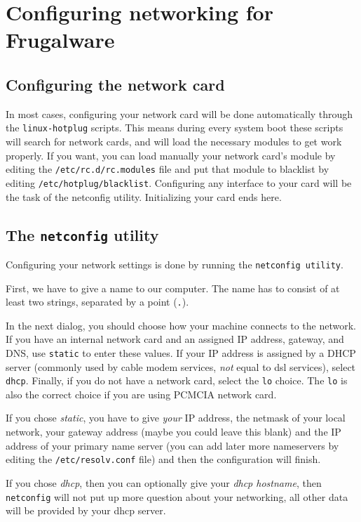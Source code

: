 \chapter{Configuring networking for Frugalware}
\section{Configuring the network card}

In most cases, configuring your network card will be done automatically through the {\tt linux-hotplug} scripts. This means during every system boot these scripts will search for network cards, and will load the necessary modules to get work properly. If you want, you can load manually your network card's module by editing the {\tt /etc/rc.d/rc.modules} file and put that module to blacklist by editing {\tt /etc/hotplug/blacklist}. Configuring any interface to your card will be the task of the netconfig utility. Initializing your card ends here.

\section{The {\tt netconfig} utility}
\label{section:netconfig}
Configuring your network settings is done by running the {\tt netconfig utility}.

First, we have to give a name to our computer. The name has to consist of at least two strings, separated by a point ({\tt .}).

In the next dialog, you should choose how your machine connects to the network. If you have an internal network card and an assigned IP address, gateway, and DNS, use {\tt static} to enter these values. If your IP address is assigned by a DHCP server (commonly used by cable modem services, \textit{not} equal to dsl services), select {\tt dhcp}. Finally, if you do not have a network card, select the {\tt lo} choice. The {\tt lo} is also the correct choice if you are using PCMCIA network card.

If you chose \textit{static}, you have to give \textit{your} IP address, the netmask of your local network, your gateway address (maybe you could leave this blank) and the IP address of your primary name server (you can add later more nameservers by editing the {\tt /etc/resolv.conf} file) and then the configuration will finish.

If you chose \textit{dhcp}, then you can optionally give your \textit{dhcp hostname}, then {\tt netconfig} will not put up more question about your networking, all other data will be provided by your dhcp server.

